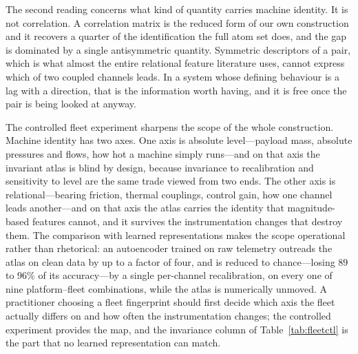 \documentclass[11pt]{article}
\begin{document}
The second reading concerns what kind of quantity carries machine identity. It
is not correlation. A correlation matrix is the reduced form of our own
construction and it recovers a quarter of the identification the full atom set
does, and the gap is dominated by a single antisymmetric quantity. Symmetric
descriptors of a pair, which is what almost the entire relational feature
literature uses, cannot express which of two coupled channels leads. In a
system whose defining behaviour is a lag with a direction, that is the
information worth having, and it is free once the pair is being looked at
anyway.

The controlled fleet experiment sharpens the scope of the whole construction.
Machine identity has two axes. One axis is absolute level---payload mass,
absolute pressures and flows, how hot a machine simply runs---and on that axis
the invariant atlas is blind by design, because invariance to recalibration
and sensitivity to level are the same trade viewed from two ends. The other
axis is relational---bearing friction, thermal couplings, control gain, how
one channel leads another---and on that axis the atlas carries the identity
that magnitude-based features cannot, and it survives the instrumentation
changes that destroy them. The comparison with learned representations makes
the scope operational rather than rhetorical: an autoencoder trained on raw
telemetry outreads the atlas on clean data by up to a factor of four, and is
reduced to chance---losing $89$ to $96\%$ of its accuracy---by a single
per-channel recalibration, on every one of nine platform--fleet combinations,
while the atlas is numerically unmoved. A practitioner choosing a fleet
fingerprint should first decide which axis the fleet actually differs on and
how often the instrumentation changes; the controlled experiment provides the
map, and the invariance column of Table~\ref{tab:fleetctl} is the part that
no learned representation can match.
\end{document}
